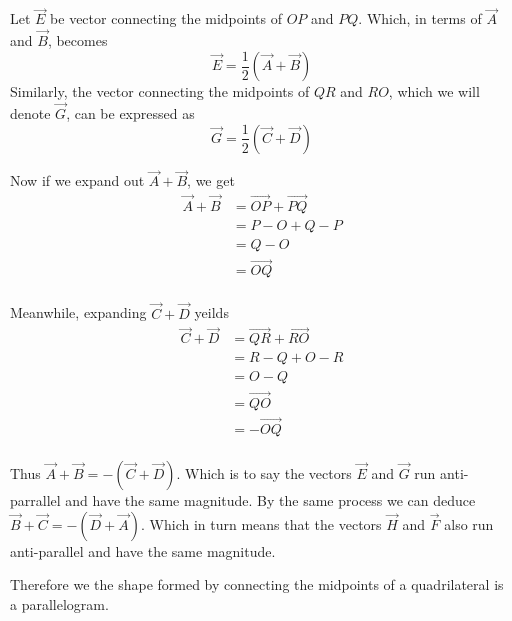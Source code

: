 Let $\vec{E}$ be vector connecting the midpoints of $OP$ and $PQ$.
Which, in terms of $\vec{A}$ and $\vec{B}$, becomes 
\[\vec{E} = \frac{1}{2}(\vec{A} + \vec{B})\]
Similarly, the vector connecting the midpoints of $QR$ and $RO$, which
we will denote $\vec{G}$, can be expressed as 
\[\vec{G} = \frac{1}{2}(\vec{C} + \vec{D})\]

Now if we expand out $\vec{A} + \vec{B}$, we get
\begin{align*} 
\vec{A} + \vec{B} &= \vec{OP} + \vec{PQ}\\
                  &= P - O + Q - P\\
                  &=  Q - O \\
                  &=  \vec{OQ} \\
\end{align*}

Meanwhile, expanding $\vec{C} + \vec{D}$ yeilds
\begin{align*} 
\vec{C} + \vec{D} &= \vec{QR} + \vec{RO}\\ 
                  &= R - Q + O - R\\ 
                  &=  O - Q \\
                  &=  \vec{QO} \\
                  &=  -\vec{OQ} \\
\end{align*} 

Thus $\vec{A} + \vec{B} = -(\vec{C} + \vec{D})$.
Which is to say the vectors $\vec{E}$ and $\vec{G}$ run anti-parrallel 
and have the same magnitude. By the same process we can deduce 
$\vec{B}+\vec{C} = -(\vec{D}+\vec{A})$. 
Which in turn means that the vectors $\vec{H}$ and $\vec{F}$ also run 
anti-parallel  and have the same magnitude.

Therefore we the shape formed by connecting the midpoints of a 
quadrilateral is a parallelogram.
